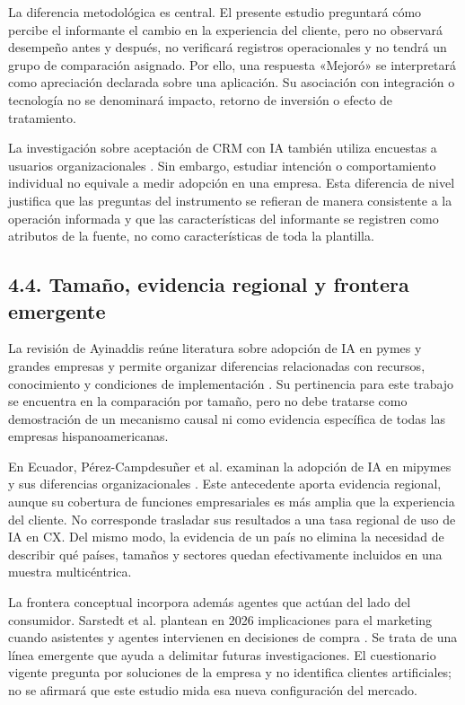 \documentclass[12pt,letterpaper]{article}
\begin{document}
La diferencia metodológica es central. El presente estudio preguntará cómo percibe el informante el cambio en la experiencia del cliente, pero no observará desempeño antes y después, no verificará registros operacionales y no tendrá un grupo de comparación asignado. Por ello, una respuesta «Mejoró» se interpretará como apreciación declarada sobre una aplicación. Su asociación con integración o tecnología no se denominará impacto, retorno de inversión o efecto de tratamiento.

La investigación sobre aceptación de CRM con IA también utiliza encuestas a usuarios organizacionales \citep{chatterjee}. Sin embargo, estudiar intención o comportamiento individual no equivale a medir adopción en una empresa. Esta diferencia de nivel justifica que las preguntas del instrumento se refieran de manera consistente a la operación informada y que las características del informante se registren como atributos de la fuente, no como características de toda la plantilla.

\subsection*{4.4. Tamaño, evidencia regional y frontera emergente}
La revisión de Ayinaddis reúne literatura sobre adopción de IA en pymes y grandes empresas y permite organizar diferencias relacionadas con recursos, conocimiento y condiciones de implementación \citep{ayinaddis}. Su pertinencia para este trabajo se encuentra en la comparación por tamaño, pero no debe tratarse como demostración de un mecanismo causal ni como evidencia específica de todas las empresas hispanoamericanas.

En Ecuador, Pérez-Campdesuñer et al. examinan la adopción de IA en mipymes y sus diferencias organizacionales \citep{perez}. Este antecedente aporta evidencia regional, aunque su cobertura de funciones empresariales es más amplia que la experiencia del cliente. No corresponde trasladar sus resultados a una tasa regional de uso de IA en CX. Del mismo modo, la evidencia de un país no elimina la necesidad de describir qué países, tamaños y sectores quedan efectivamente incluidos en una muestra multicéntrica.

La frontera conceptual incorpora además agentes que actúan del lado del consumidor. Sarstedt et al. plantean en 2026 implicaciones para el marketing cuando asistentes y agentes intervienen en decisiones de compra \citep{sarstedt}. Se trata de una línea emergente que ayuda a delimitar futuras investigaciones. El cuestionario vigente pregunta por soluciones de la empresa y no identifica clientes artificiales; no se afirmará que este estudio mida esa nueva configuración del mercado.
\end{document}
